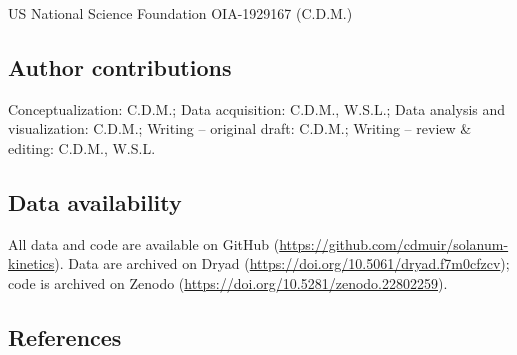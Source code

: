 \documentclass[
  letterpaper,
  DIV=11,
  numbers=noendperiod]{scrartcl}
\begin{document}
US National Science Foundation OIA-1929167 (C.D.M.)

\subsection{Author contributions}\label{author-contributions}

Conceptualization: C.D.M.; Data acquisition: C.D.M., W.S.L.; Data
analysis and visualization: C.D.M.; Writing -- original draft: C.D.M.;
Writing -- review \& editing: C.D.M., W.S.L.

\subsection{Data availability}\label{data-availability}

All data and code are available on GitHub
(\url{https://github.com/cdmuir/solanum-kinetics}). Data are archived on
Dryad (\url{https://doi.org/10.5061/dryad.f7m0cfzcv}); code is archived
on Zenodo (\url{https://doi.org/10.5281/zenodo.22802259}).

\subsection{References}\label{references}

\singlespacing
\end{document}
